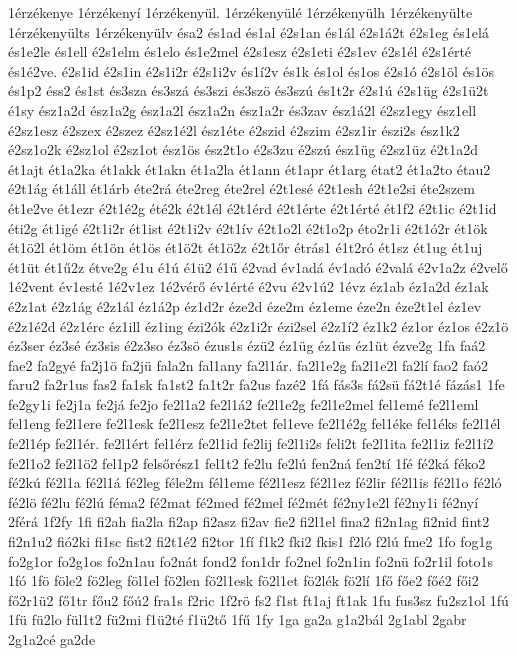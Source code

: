 {1érzékenye
1érzékenyí
1érzékenyül.
1érzékenyülé
1érzékenyülh
1érzékenyülte
1érzékenyülts
1érzékenyülv
ésa2
és1ad
és1al
é2s1an
és1ál
é2s1á2t
é2s1eg
és1elá
és1e2le
és1ell
é2s1elm
és1elo
és1e2mel
é2s1esz
é2s1eti
é2s1ev
é2s1él
é2s1érté
és1é2ve.
é2s1id
é2s1in
é2s1i2r
é2s1i2v
és1í2v
és1k
és1ol
és1os
é2s1ó
é2s1öl
és1ös
és1p2
éss2
és1st
és3sza
és3szá
és3szi
és3szö
és3szú
és1t2r
é2s1ú
é2s1üg
é2s1ü2t
é1sy
ész1a2d
ész1a2g
ész1a2l
ész1a2n
ész1a2r
és3zav
ész1á2l
é2sz1egy
ész1ell
é2sz1esz
é2szex
é2szez
é2sz1é2l
ész1éte
é2szid
é2szim
é2sz1ir
észi2s
ész1k2
é2sz1o2k
é2sz1ol
é2sz1ot
ész1ös
ész2t1o
é2s3zu
é2szú
ész1üg
é2sz1üz
é2t1a2d
ét1ajt
ét1a2ka
ét1akk
ét1akn
ét1a2la
ét1ann
ét1apr
ét1arg
état2
ét1a2to
étau2
é2t1ág
ét1áll
ét1árb
éte2rá
éte2reg
éte2rel
é2t1esé
é2t1esh
é2t1e2si
éte2szem
ét1e2ve
ét1ezr
é2t1é2g
été2k
é2t1él
é2t1érd
é2t1érte
é2t1érté
ét1f2
é2t1ic
é2t1id
éti2g
ét1igé
é2t1i2r
ét1ist
é2t1i2v
é2t1ív
é2t1o2l
é2t1o2p
éto2r1i
é2t1ó2r
ét1ök
ét1ö2l
ét1öm
ét1ön
ét1ös
ét1ö2t
ét1ö2z
é2t1őr
étrás1
é1t2ró
ét1sz
ét1ug
ét1uj
ét1üt
ét1ű2z
étve2g
é1u
é1ú
é1ü2
é1ű
é2vad
év1adá
év1adó
é2valá
é2v1a2z
é2velő
1é2vent
év1esté
1é2v1ez
1é2vérő
év1érté
é2vu
é2v1ú2
1évz
éz1ab
éz1a2d
éz1ak
é2z1at
é2z1ág
é2z1ál
éz1á2p
éz1d2r
éze2d
éze2m
éz1eme
éze2n
éze2t1el
éz1ev
é2z1é2d
é2z1érc
éz1ill
éz1ing
ézi2ók
é2z1i2r
ézi2sel
é2z1í2
éz1k2
éz1or
éz1os
é2z1ö
éz3ser
éz3sé
éz3sis
é2z3so
éz3sö
ézus1s
ézü2
éz1üg
éz1üs
éz1üt
ézve2g
1fa
faá2
fae2
fa2gyé
fa2j1ö
fa2jü
fala2n
fal1any
fa2l1ár.
fa2l1e2g
fa2l1e2l
fa2lí
fao2
faó2
faru2
fa2r1us
fas2
fa1sk
fa1st2
fa1t2r
fa2us
fazé2
1fá
fás3s
fá2sü
fá2t1é
fázás1
1fe
fe2gy1i
fe2j1a
fe2já
fe2jo
fe2l1a2
fe2l1á2
fe2l1e2g
fe2l1e2mel
fel1emé
fe2l1eml
fel1eng
fe2l1ere
fe2l1esk
fe2l1esz
fe2l1e2tet
fel1eve
fe2l1é2g
fel1éke
fel1éks
fe2l1él
fe2l1ép
fe2l1ér.
fe2l1ért
fel1érz
fe2l1id
fe2lij
fe2l1i2s
feli2t
fe2l1ita
fe2l1iz
fe2l1í2
fe2l1o2
fe2l1ö2
fel1p2
felsőrész1
fel1t2
fe2lu
fe2lú
fen2ná
fen2tí
1fé
fé2ká
féko2
fé2kú
fé2l1a
fé2l1á
fé2leg
féle2m
fél1eme
fé2l1esz
fé2l1ez
fé2lir
fé2l1is
fé2l1o
fé2ló
fé2lö
fé2lu
fé2lú
féma2
fé2mat
fé2med
fé2mel
fé2mét
fé2ny1e2l
fé2ny1i
fé2nyí
2férá
1f2fy
1fi
fi2ah
fia2la
fi2ap
fi2asz
fi2av
fie2
fi2l1el
fina2
fi2n1ag
fi2nid
fint2
fi2n1u2
fió2ki
fi1sc
fist2
fi2t1é2
fi2tor
1fí
f1k2
fki2
fkis1
f2ló
f2lú
fme2
1fo
fog1g
fo2g1or
fo2g1os
fo2n1au
fo2nát
fond2
fon1dr
fo2nel
fo2n1in
fo2nü
fo2r1il
foto1s
1fó
1fö
föle2
fö2leg
föl1el
fö2len
fö2l1esk
fö2l1et
fö2lék
fö2lí
1fő
főe2
főé2
fői2
fő2r1ü2
fő1tr
főu2
főú2
fra1s
f2ric
1f2rö
fs2
f1st
ft1aj
ft1ak
1fu
fus3sz
fu2sz1ol
1fú
1fü
fü2lo
fül1t2
fü2mi
f1ü2té
f1ü2tő
1fű
1fy
1ga
ga2a
g1a2bál
2g1abl
2gabr
2g1a2cé
ga2de
}
